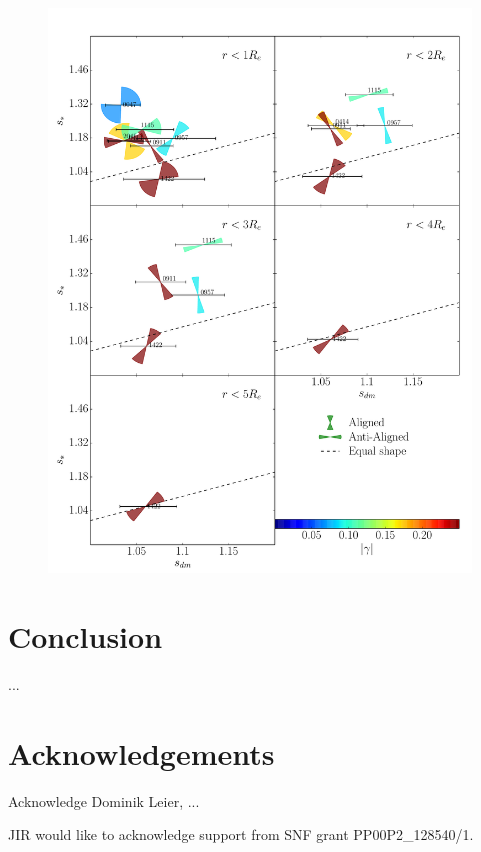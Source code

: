 \documentclass[useAMS,usenatbib]{mn2e}
\begin{document}
\begin{figure}
  \centering
  \includegraphics[width=.8\linewidth]{Figures/wedges.pdf}
  \caption[width=.65\linewidth]{}
  \label{fig:wedgesall}
\end{figure}

\section{Conclusion}\label{sec:conclusion}
...


\section{Acknowledgements}\label{sec:acknowledgements}
Acknowledge Dominik Leier, ...

JIR would like to acknowledge support from SNF grant PP00P2\_128540/1.




\end{document}
